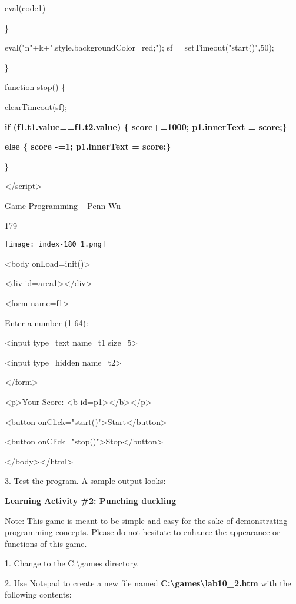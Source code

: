 \documentclass[
]{article}
\begin{document}
eval(code1)

\}

eval("n"+k+".style.backgroundColor=\textquotesingle red\textquotesingle;");
sf = setTimeout("start()",50);

\}

function stop() \{

clearTimeout(sf);

\textbf{if (f1.t1.value==f1.t2.value) \{ score+=1000; p1.innerText =
score;\}}

\textbf{else \{ score -=1; p1.innerText = score;\}}

\}

\textless/script\textgreater{}

Game Programming -- Penn Wu

179

\protect\hypertarget{index_split_011.htmlux5cux23p180}{}{}\texttt{[image: index-180\_1.png]}

\textless body onLoad=init()\textgreater{}

\textless div id=area1\textgreater\textless/div\textgreater{}

\textless form name=f1\textgreater{}

Enter a number (1-64):

\textless input type=text name=t1 size=5\textgreater{}

\textless input type=hidden name=t2\textgreater{}

\textless/form\textgreater{}

\textless p\textgreater Your Score: \textless b
id=p1\textgreater\textless/b\textgreater\textless/p\textgreater{}

\textless button
onClick="start()"\textgreater Start\textless/button\textgreater{}

\textless button
onClick="stop()"\textgreater Stop\textless/button\textgreater{}

\textless/body\textgreater\textless/html\textgreater{}

3. Test the program. A sample output looks:

\textbf{Learning Activity \#2: Punching duckling}

Note: This game is meant to be simple and easy for the sake of
demonstrating programming concepts. Please do not hesitate to enhance
the appearance or functions of this game.

1. Change to the C:\textbackslash games directory.

2. Use Notepad to create a new file named
\textbf{C:\textbackslash games\textbackslash lab10\_2.htm} with the
following contents:
\end{document}
